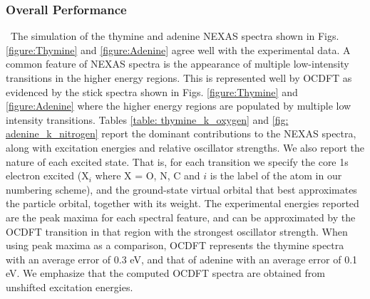 \documentclass[12pt]{article}
\begin{document}
\subsubsection{Overall Performance}
\ The simulation of the thymine and adenine NEXAS spectra shown in Figs.\ref{figure:Thymine} and \ref{figure:Adenine} agree well with the experimental data. A common feature of NEXAS spectra is the appearance of multiple low-intensity transitions in the higher energy regions. This is represented well by OCDFT as evidenced by the stick spectra shown in Figs. \ref{figure:Thymine} and \ref{figure:Adenine} where the higher energy regions are populated by multiple low intensity transitions. Tables \ref{table: thymine_k_oxygen} and \ref{fig: adenine_k_nitrogen} report the dominant contributions to the NEXAS spectra, along with excitation energies and relative oscillator strengths. We also report the nature of each excited state. That is, for each transition we specify the core 1s electron excited (X$_i$ where X = O, N, C and $i$ is the label of the atom in our numbering scheme), and the ground-state virtual orbital that best approximates the particle orbital, together with its weight.
 The experimental energies reported are the peak maxima for each spectral feature, and can be approximated by the OCDFT transition in that region with the strongest oscillator strength. When using peak maxima as a comparison, OCDFT represents the thymine spectra with an average error of 0.3 eV, and that of adenine with an average error of 0.1 eV. We emphasize that the computed OCDFT spectra are obtained from unshifted excitation energies. 
\end{document}
